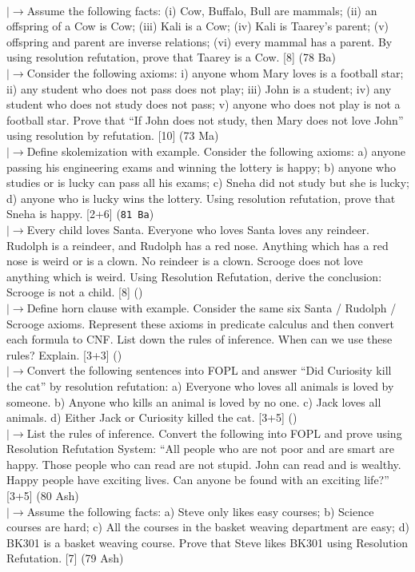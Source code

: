 \documentclass[12pt]{article}
\newcommand{\lb}{\\$\left|\rightarrow\right.$}
\begin{document}
\begin{enumerate}[topsep=0pt, noitemsep]
        \lb Assume the following facts: (i) Cow, Buffalo, Bull are mammals; (ii) an offspring of a Cow is Cow; (iii) Kali is a Cow; (iv) Kali is Taarey's parent; (v) offspring and parent are inverse relations; (vi) every mammal has a parent. By using resolution refutation, prove that Taarey is a Cow. \hfill [8] (78 Ba)
        \lb Consider the following axioms: i) anyone whom Mary loves is a football star; ii) any student who does not pass does not play; iii) John is a student; iv) any student who does not study does not pass; v) anyone who does not play is not a football star. Prove that ``If John does not study, then Mary does not love John'' using resolution by refutation. \hfill [10] (73 Ma)
        \lb Define skolemization with example. Consider the following axioms: a) anyone passing his engineering exams and winning the lottery is happy; b) anyone who studies or is lucky can pass all his exams; c) Sneha did not study but she is lucky; d) anyone who is lucky wins the lottery. Using resolution refutation, prove that Sneha is happy. \hfill [2+6] (\texttt{81 Ba})
        \lb Every child loves Santa. Everyone who loves Santa loves any reindeer. Rudolph is a reindeer, and Rudolph has a red nose. Anything which has a red nose is weird or is a clown. No reindeer is a clown. Scrooge does not love anything which is weird. Using Resolution Refutation, derive the conclusion: Scrooge is not a child. \hfill [8] ()
        \lb Define horn clause with example. Consider the same six Santa / Rudolph / Scrooge axioms. Represent these axioms in predicate calculus and then convert each formula to CNF. List down the rules of inference. When can we use these rules? Explain. \hfill [3+3] ()
        \lb Convert the following sentences into FOPL and answer ``Did Curiosity kill the cat'' by resolution refutation: a) Everyone who loves all animals is loved by someone. b) Anyone who kills an animal is loved by no one. c) Jack loves all animals. d) Either Jack or Curiosity killed the cat. \hfill [3+5] ()
        \lb List the rules of inference. Convert the following into FOPL and prove using Resolution Refutation System: ``All people who are not poor and are smart are happy. Those people who can read are not stupid. John can read and is wealthy. Happy people have exciting lives. Can anyone be found with an exciting life?'' \hfill [3+5] (80 Ash)
        \lb Assume the following facts: a) Steve only likes easy courses; b) Science courses are hard; c) All the courses in the basket weaving department are easy; d) BK301 is a basket weaving course. Prove that Steve likes BK301 using Resolution Refutation. \hfill [7] (79 Ash)

\end{enumerate}
\end{document}
